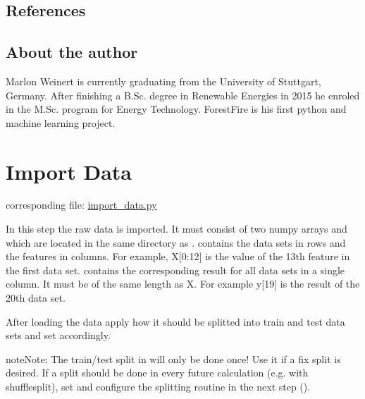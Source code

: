 \documentclass[letterpaper,10pt,english]{sphinxmanual}
\begin{document}
\subsection{References}
\label{\detokenize{Overview:references}}

\subsection{About the author}
\label{\detokenize{Overview:about-the-author}}
Marlon Weinert is currently graduating from the University of Stuttgart, Germany.
After finishing a B.Sc. degree in Renewable Energies in 2015 he enroled in the M.Sc. program for Energy Technology.
ForestFire is his first python and machine learning project.


\section{Import Data}
\label{\detokenize{Importing_Data:import-data}}\label{\detokenize{Importing_Data::doc}}\label{\detokenize{Importing_Data:id1}}
corresponding file: \href{https://github.com/weinertmos/ForestFire/blob/master/source/ForestFire/import\_data.py}{import\_data.py}

In this step the raw data is imported.
It must consist of two numpy arrays  and  which are located in the same directory as .
 contains the data sets in rows and the features in columns.
For example, X{[}0:12{]} is the value of the 13th feature in the first data set.
 contains the corresponding result for all data sets in a single column.
It must be of the same length as X.
For example y{[}19{]} is the result of the 20th data set.

After loading the data apply how it should be splitted into train and test data sets and set  accordingly.

\begin{sphinxadmonition}{note}{Note:}
The train/test split in  will only be done once!
Use it if a fix split is desired.
If a split should be done in every future calculation (e.g. with shufflesplit),
set  and configure the splitting routine
in the next step ({\hyperref[\detokenize{Generate_Database:compute}]{}}).
\end{sphinxadmonition}
\end{document}
